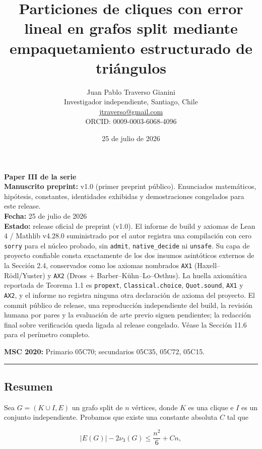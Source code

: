 \documentclass[
  11pt,
]{article}
\title{Particiones de cliques con error lineal en grafos split mediante
empaquetamiento estructurado de triángulos}
\author{Juan Pablo Traverso Gianini\\
\small Investigador independiente, Santiago, Chile\\
\small \href{mailto:jtraverso@gmail.com}{jtraverso@gmail.com}\\
\small ORCID: 0009-0003-6068-4096}
\date{25 de julio de 2026}
\begin{document}
\sloppy
\raggedbottom
\maketitle

\begin{small}\begin{raggedright}
\textbf{Paper III de la serie}\\
\textbf{Manuscrito preprint:} v1.0 (primer preprint público). Enunciados matemáticos, hipótesis, constantes, identidades exhibidas y demostraciones congelados para este release.\\
\textbf{Fecha:} 25 de julio de 2026\\
\textbf{Estado:} release oficial de preprint (v1.0). El informe de build y axiomas de Lean 4 / Mathlib v4.28.0 suministrado por el autor registra una compilación con cero \texttt{sorry} para el núcleo probado, sin \texttt{admit}, \texttt{native\_decide} ni \texttt{unsafe}. Su capa de proyecto confiable consta exactamente de los dos insumos asintóticos externos de la Sección 2.4, conservados como los axiomas nombrados \texttt{AX1} (Haxell--Rödl/Yuster) y \texttt{AX2} (Dross + Barber--Kühn--Lo--Osthus). La huella axiomática reportada de Teorema 1.1 es \texttt{propext}, \texttt{Classical.choice}, \texttt{Quot.sound}, \texttt{AX1} y \texttt{AX2}, y el informe no registra ninguna otra declaración de axioma del proyecto. El commit público de release, una reproducción independiente del build, la revisión humana por pares y la evaluación de arte previo siguen pendientes; la redacción final sobre verificación queda ligada al release congelado. Véase la Sección 11.6 para el perímetro completo.

\textbf{MSC 2020:} Primario 05C70; secundarios 05C35, 05C72, 05C15.
\begin{center}\rule{0.5\linewidth}{0.5pt}\end{center}
\end{raggedright}\end{small}

\subsection{Resumen}\label{resumen}

Sea \(G=(K\cup I,E)\) un grafo split de \(n\) vértices, donde \(K\) es
una clique e \(I\) es un conjunto independiente. Probamos que existe una
constante absoluta \(C\) tal que

\[
|E(G)|-2\nu_3(G)
\le
\frac{n^2}{6}+Cn,
\]
\end{document}
